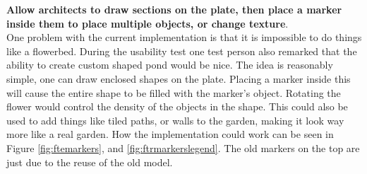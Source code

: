 \textbf{Allow architects to draw sections on the plate, then place a marker inside them to place multiple objects, or change texture}.\\ One problem with the current implementation is that it is impossible to do things like a flowerbed. During the usability test one test person also remarked that the ability to create custom shaped pond would be nice. The idea is reasonably simple, one can draw enclosed shapes on the plate. Placing a marker inside this will cause the entire shape to be filled with the marker's object. Rotating the flower would control the density of the objects in the shape. This could also be used to add things like tiled paths, or walls to the garden, making it look way more like a real garden. How the implementation could work can be seen in Figure \ref{fig:ftemarkers}, and \ref{fig:ftrmarkerslegend}. The old markers on the top are just due to the reuse of the old model.

